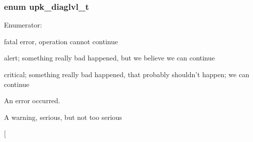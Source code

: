 \subsubsection[{upk\_\-diaglvl\_\-t}]{\setlength{\rightskip}{0pt plus 5cm}enum {\bf upk\_\-diaglvl\_\-t}}\label{group__upk__errors_ga69a581dfd708ad2e18688e01cbcc0ff8}
\begin{Desc}
\item[Enumerator: ]\par
\begin{description}
\item[{\em 
UPK\_\-DIAGLVL\_\-FATAL\label{group__upk__errors_gga69a581dfd708ad2e18688e01cbcc0ff8a600f5dbf5250560dfb55d2b960d25b95}
}]fatal error, operation cannot continue \item[{\em 
UPK\_\-DIAGLVL\_\-ALERT\label{group__upk__errors_gga69a581dfd708ad2e18688e01cbcc0ff8a42b4debd590867bfd13127c7998ca3eb}
}]alert; something really bad happened, but we believe we can continue \item[{\em 
UPK\_\-DIAGLVL\_\-CRIT\label{group__upk__errors_gga69a581dfd708ad2e18688e01cbcc0ff8a2459215f50532f8bd045d8926b09cbe1}
}]critical; something really bad happened, that probably shouldn't happen; we can continue \item[{\em 
UPK\_\-DIAGLVL\_\-ERROR\label{group__upk__errors_gga69a581dfd708ad2e18688e01cbcc0ff8a554508c4755c0b5a7254b5032c8220d2}
}]An error occurred. \item[{\em 
UPK\_\-DIAGLVL\_\-WARN\label{group__upk__errors_gga69a581dfd708ad2e18688e01cbcc0ff8a28fff8a74dfb72e3c0fad13c8fcd6168}
}]A warning, serious, but not too serious \item[{\em 
}
\end{description}
\end{Desc}
